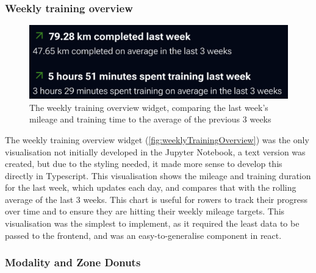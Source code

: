 \subsubsection{Weekly training overview}

\begin{figure}[htbp]

    \centering
    \includegraphics[width=0.75\linewidth]{figures/trainingOverviewWidget.png}
    \captionsetup{justification=centering}
    \caption[Weekly Training Overview]{\label{fig:weeklyTrainingOverview}The weekly training overview widget, comparing the last week's mileage and training time to the average of the previous 3 weeks} 
\end{figure}

The weekly training overview widget (\autoref{fig:weeklyTrainingOverview}) was the only visualisation not initially developed in the Jupyter Notebook, a text version was created, but due to the styling needed, it made more sense to develop this directly in Typescript. This visualisation shows the mileage and training duration for the last week, which updates each day, and compares that with the rolling average of the last 3 weeks. This chart is useful for rowers to track their progress over time and to ensure they are hitting their weekly mileage targets. This visualisation was the simplest to implement, as it required the least data to be passed to the frontend, and was an easy-to-generalise component in react.


\subsubsection{Modality and Zone Donuts}

